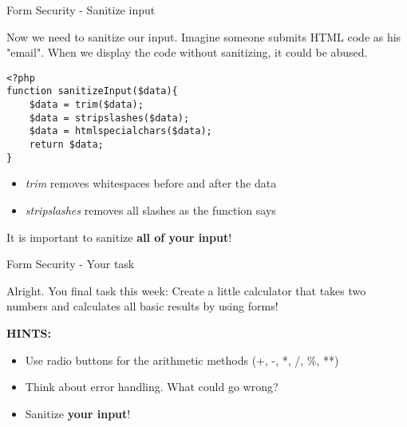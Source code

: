 \begin{frame}[fragile]{Form Security - Sanitize input}

	Now we need to sanitize our input. Imagine someone submits HTML code as his "email". When we display the code without sanitizing, it could be abused. \pause

	\begin{lstlisting}
<?php
function sanitizeInput($data){
	$data = trim($data);
	$data = stripslashes($data);
	$data = htmlspecialchars($data);
	return $data;
}
	\end{lstlisting}
	\pause
	
	\begin{itemize}
	\item \emph{trim} removes whitespaces before and after the data \pause
	\item \emph{stripslashes} removes all slashes as the function says \pause
	\end{itemize}
	
	It is important to sanitize \textbf{all of your input}!

\end{frame}

\begin{frame}[fragile]{Form Security - Your task}

	Alright. You final task this week: Create a little calculator that takes two numbers and calculates all basic results by using forms! \pause
	
	\textbf{HINTS:}
	\begin{itemize}
	\item Use radio buttons for the arithmetic methods (+, -, *, /, \%, **) \pause
	\item Think about error handling. What could go wrong? \pause
	\item Sanitize \textbf{your input}!
	\end{itemize}

\end{frame}



